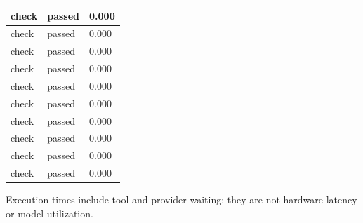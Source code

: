 \documentclass[11pt,a4paper]{article}
\begin{document}
{\begin{longtable}{@{}L{0.57\textwidth}|L{0.16\textwidth}|L{0.17\textwidth}@{}}
check & passed & 0.000\\[2pt]\hline

check & passed & 0.000\\[2pt]\hline

check & passed & 0.000\\[2pt]\hline

check & passed & 0.000\\[2pt]\hline

check & passed & 0.000\\[2pt]\hline

check & passed & 0.000\\[2pt]\hline

check & passed & 0.000\\[2pt]\hline

check & passed & 0.000\\[2pt]\hline

check & passed & 0.000\\[2pt]\hline

check & passed & 0.000\\[2pt]\hline

\bottomrule\end{longtable}}

Execution times include tool and provider waiting; they are not hardware latency or model utilization.
\end{document}

